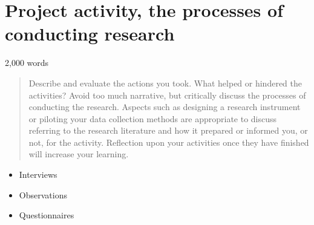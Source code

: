 \section{Project activity, the processes of conducting research}
2,000 words 

\begin{quote}
Describe and evaluate the actions you took. What helped or hindered the activities? Avoid too much narrative, but critically discuss the processes of conducting the research. Aspects such as designing a research instrument or piloting your data collection methods are appropriate to discuss referring to the research literature and how it prepared or informed you, or not, for the activity. Reflection upon your activities once they have finished will increase your learning.
\end{quote}

\begin{itemize}
\item Interviews
\item Observations
\item Questionnaires 
\end{itemize}